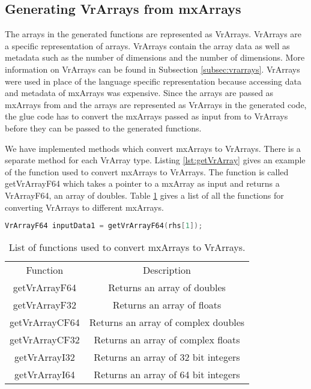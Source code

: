 \subsection{Generating VrArrays from mxArrays}
The arrays in the generated functions are represented as VrArrays. VrArrays are a \velocty specific representation of arrays. VrArrays contain the array data as well as metadata such as the number of dimensions and the number of dimensions. More information on VrArrays can be found in Subsection \ref{subsec:vrarrays}. VrArrays were used in place of the language specific representation because accessing data and metadata of mxArrays was expensive. Since the arrays are passed as mxArrays from \matlab and the arrays are represented as VrArrays in the generated code, the glue code has to convert the mxArrays passed as input from \matlab to VrArrays before they can be passed to the generated functions. 

We have implemented methods which convert mxArrays to VrArrays. There is a separate method for each VrArray type. Listing \ref{lst:getVrArray} gives an example of the function used to convert mxArrays to VrArrays. The function is called getVrArrayF64 which takes a pointer to a mxArray as input and returns a VrArrayF64, an array of doubles. Table \ref{tab:getVrArray} gives a list of all the functions for converting VrArrays to different mxArrays. 

\begin{lstlisting}[float,language=c,caption={Converting mxArrays to VrArrays},label={lst:getVrArray}]
VrArrayF64 inputData1 = getVrArrayF64(rhs[1]);
\end{lstlisting}

\begin{table}[htbp]
\centering
\begin{tabular}{|c|c|}
\hline
Function       & Description                         \\ \hhline{|=|=|}
getVrArrayF64  & Returns an array of doubles         \\ \hline
getVrArrayF32  & Returns an array of floats          \\ \hline
getVrArrayCF64 & Returns an array of complex doubles \\ \hline
getVrArrayCF32 & Returns an array of complex floats  \\ \hline
getVrArrayI32  & Returns an array of 32 bit integers \\ \hline
getVrArrayI64  & Returns an array of 64 bit integers  \\ \hline
\end{tabular}
\caption{List of functions used to convert mxArrays to VrArrays.}
\label{tab:getVrArray}
\end{table}

